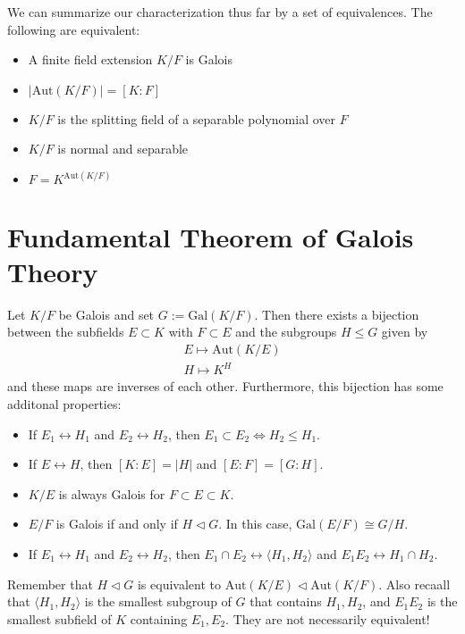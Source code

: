 \documentclass{memoir}
\begin{document}


We can summarize our characterization thus far by a set of equivalences. The following are equivalent:
\begin{itemize}
	\item A finite field extension \(K / F\) is Galois
	\item \(\left| \textrm{Aut}(K / F) \right| = [K:F]\) 
	\item \(K / F\) is the splitting field of a separable polynomial over \(F\) 
	\item \(K / F\) is normal and separable
	\item \(F = K^{\textrm{Aut}(K / F)}\)
\end{itemize}

\section{Fundamental Theorem of Galois Theory}
\label{sec:fundamental_theorem_of_galois_theory}

\begin{thm}
	Let \(K / F\) be Galois and set \(G:= \textrm{Gal}(K / F)\). Then there exists a bijection between the subfields \(E\subset K\) with \(F\subset E\) and the subgroups \(H \leq G\) given by
\begin{align*}
	E \mapsto \textrm{Aut}(K / E)\\
	H \mapsto K^{H}
\end{align*}
and these maps are inverses of each other. Furthermore, this bijection has some additonal properties:
\begin{itemize}
	\item If \(E_1 \leftrightarrow H_1\) and \(E_2 \leftrightarrow H_2\), then \(E_1 \subset E_2 \iff H_2 \leq H_1\).
	\item If \(E \leftrightarrow H\), then \([K:E] = \left| H \right| \) and \([E:F] = [G:H]\).
	\item \(K / E\) is always Galois for \(F \subset E \subset  K\).
	\item \(E / F\) is Galois if and only if \(H \triangleleft G\). In this case, \(\textrm{Gal}(E / F) \cong G / H\).
	\item If \(E_1 \leftrightarrow H_1\) and \(E_2 \leftrightarrow H_2\), then \(E_1 \cap E_2 \leftrightarrow \langle H_1,H_2 \rangle \) and \(E_1E_2 \leftrightarrow H_1 \cap H_2\).
\end{itemize}
\end{thm}
Remember that \(H \triangleleft G\) is equivalent to \(\textrm{Aut}(K / E) \triangleleft \textrm{Aut}(K / F)\). Also recaall that \(\langle H_1,H_2 \rangle \) is the smallest subgroup of \(G\) that contains \(H_1,H_2\), and \(E_1E_2\) is the smallest subfield of \(K\) containing \(E_1,E_2\). They are not necessarily equivalent!



\vspace{5mm}
\end{document}
